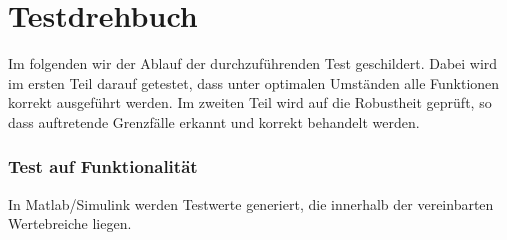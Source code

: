 \documentclass[fontsize = 12pt, paper = a4]{scrreprt}
\begin{document}








\chapter*{Testdrehbuch}
Im folgenden wir der Ablauf der durchzuführenden Test geschildert. Dabei wird im ersten Teil darauf getestet, dass unter optimalen Umständen alle Funktionen korrekt ausgeführt werden. Im zweiten Teil wird auf die Robustheit geprüft, so dass auftretende Grenzfälle erkannt und korrekt behandelt werden.


\subsection*{Test auf Funktionalität}
In Matlab/Simulink werden Testwerte generiert, die innerhalb der vereinbarten Wertebreiche liegen. 
\end{document}
